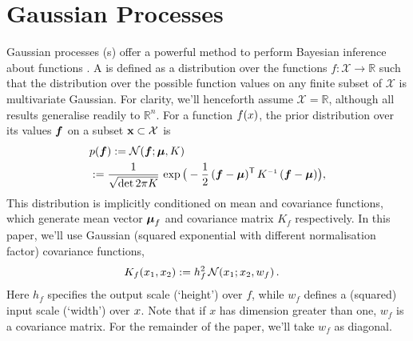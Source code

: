 \documentclass{article}
\begin{document}


\section{Gaussian Processes}
Gaussian processes (\gp s) offer a powerful method to perform Bayesian inference about functions \citep{GPsBook}. A \gpb is defined as a distribution over the functions $f: \mathcal{X} \rightarrow \mathbb{R}$ such that the distribution over the possible function values on any finite subset of $\mathcal{X}$ is multivariate Gaussian. For clarity, we'll henceforth assume $\mathcal{X} = \mathbb{R}$, although all results generalise readily to $\mathbb{R}^n$. For a function $f(\lfv)$, the prior distribution over its values $\vf$ on a subset $\vlfv \subset \mathcal{X}$ is
\begin{align}%
\textstyle
 &\po{\vf}\deq \N{\vf}{\vmu}{K}\\
 &\deq\frac{1}{\sqrt{\det{2\pi K}}}\,\exp \big(-\frac{1}{2}\,(\vf-\vmu)\tra\,K\inv\,(\vf-\vmu)\big),
\end{align}
This distribution is implicitly conditioned on mean and covariance functions, which generate mean vector $\vmu_{f}$ and covariance matrix $K_{f}$ respectively. 
In this paper, we'll use Gaussian (squared exponential with different normalisation factor) covariance functions,
\begin{align} \label{eq:Gaussian_cov_fn}
\textstyle
K_{f}(\lfv_1,\lfv_2)& \deq h_f^2\,\N{\lfv_1}{\lfv_2}{w_{f}}.
\end{align} 
Here $h_f$ specifies the output scale (`height') over $f$, while $w_f$ defines a (squared) input scale (`width') over $\lfv$. Note that if $x$ has dimension greater than one, $w_f$ is a covariance matrix. For the remainder of the paper, we'll take $w_f$ as diagonal. 
\end{document}
